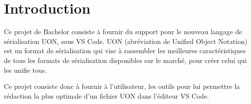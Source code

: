 \documentclass[
    iict, %
    il, %
]{heig-tb}
\begin{document}
\maketitle
\frontmatter
\clearemptydoublepage

\preamble
\let\cleardoublepage\clearpage
\authentification
\let\cleardoublepage\clearpage

\begin{abstract}
    
\end{abstract}

\listoffigures
{}
\listoflistings
{}

\tableofcontents

\printnomenclature
\clearemptydoublepage
{}

\pagestyle{fancy}
\fancyhf{}
\renewcommand\headrulewidth{1pt}

\fancyhead[L]{\itshape\nouppercase{\leftmark}}

\renewcommand{\chaptermark}[1]{\markboth{\MakeUppercase{#1}}{}}

\renewcommand\footrulewidth{1pt}


\renewcommand{\headrulewidth}{0.4pt}
\renewcommand{\footrulewidth}{0.4pt}

\titlespacing*{\chapter}{0pt}{-40pt}{20pt}

\mainmatter
\chapter{Introduction}

Ce projet de Bachelor consiste à fournir du support pour le nouveau langage de sérialisation UON, sous VS Code.
UON (abréviation de Unified Object Notation) est un format de sérialisation qui vise à rassembler les meilleures caractéristiques de tous les formats de sérialisation disponibles sur le marché, pour créer celui qui les unifie tous.

Ce projet consiste donc à fournir à l'utilisateur, les outils pour lui permettre la rédaction la plus optimale d'un fichier UON dans l'éditeur VS Code.
\end{document}
